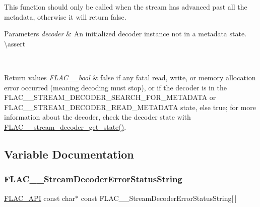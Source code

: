 This function should only be called when the stream has advanced past all the metadata, otherwise it will return {\ttfamily false}.


\begin{DoxyParams}{Parameters}
{\em decoder} & An initialized decoder instance not in a metadata state. \textbackslash{}assert 
\begin{DoxyCode}{1}
\end{DoxyCode}
 \\
\hline
\end{DoxyParams}

\begin{DoxyRetVals}{Return values}
{\em F\+L\+A\+C\+\_\+\+\_\+bool} & {\ttfamily false} if any fatal read, write, or memory allocation error occurred (meaning decoding must stop), or if the decoder is in the F\+L\+A\+C\+\_\+\+\_\+\+S\+T\+R\+E\+A\+M\+\_\+\+D\+E\+C\+O\+D\+E\+R\+\_\+\+S\+E\+A\+R\+C\+H\+\_\+\+F\+O\+R\+\_\+\+M\+E\+T\+A\+D\+A\+TA or F\+L\+A\+C\+\_\+\+\_\+\+S\+T\+R\+E\+A\+M\+\_\+\+D\+E\+C\+O\+D\+E\+R\+\_\+\+R\+E\+A\+D\+\_\+\+M\+E\+T\+A\+D\+A\+TA state, else {\ttfamily true}; for more information about the decoder, check the decoder state with \mbox{\hyperlink{group__flac__stream__decoder_ga5899c204ad7183ec04e41855090c0635}{F\+L\+A\+C\+\_\+\+\_\+stream\+\_\+decoder\+\_\+get\+\_\+state()}}. \\
\hline
\end{DoxyRetVals}


\subsection{Variable Documentation}
\mbox{\label{group__flac__stream__decoder_gadc56befa033b67dd3befcd2f5f909ec1}} 
\subsubsection{\texorpdfstring{FLAC\_\_StreamDecoderErrorStatusString}{FLAC\_\_StreamDecoderErrorStatusString}}
{\footnotesize\ttfamily \mbox{\hyperlink{group__flac__export_ga56ca07df8a23310707732b1c0007d6f5}{F\+L\+A\+C\+\_\+\+A\+PI}} const char$\ast$ const F\+L\+A\+C\+\_\+\+\_\+\+Stream\+Decoder\+Error\+Status\+String\mbox{[}$\,$\mbox{]}}

